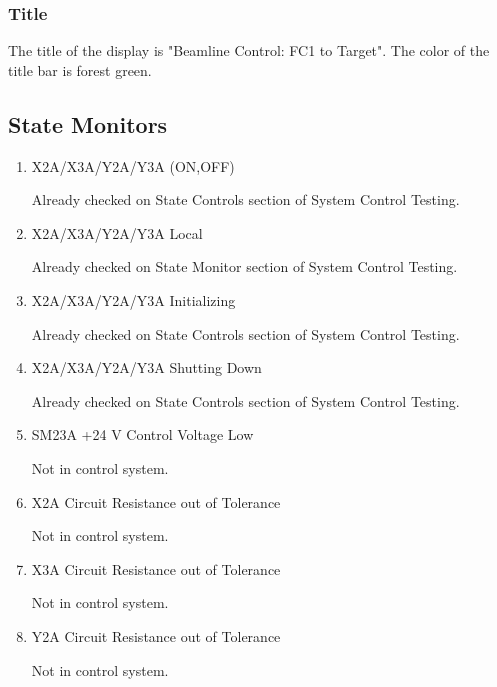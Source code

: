 \documentclass[11pt]{book}		%
\begin{document}
\subsubsection{Title}\label{sect:cyc-op-interface-status-terminal-display-contents-beamline-target-title}

The title of the display is "Beamline Control: FC1 to Target".  The color of the title bar is forest green.

\subsection{State Monitors} \label{sect:cyc-op-interface-status-beamline-fc1totarget-state-monitors}

\begin{enumerate}
 \item X2A/X3A/Y2A/Y3A (ON,OFF)

\color{red}
Already checked on State Controls section of System Control Testing.
\color{black}

 \item X2A/X3A/Y2A/Y3A Local

\color{red}
Already checked on State Monitor section of System Control Testing.
\color{black}

 \item X2A/X3A/Y2A/Y3A Initializing

\color{red}
Already checked on State Controls section of System Control Testing.
\color{black}

 \item X2A/X3A/Y2A/Y3A Shutting Down

\color{red}
Already checked on State Controls section of System Control Testing.
\color{black}

 \item SM23A +24 V Control Voltage Low

\color{red}
Not in control system.
\color{black}

 \item X2A Circuit Resistance out of Tolerance

\color{red}
Not in control system.
\color{black}

 \item X3A Circuit Resistance out of Tolerance

\color{red}
Not in control system.
\color{black}

 \item Y2A Circuit Resistance out of Tolerance

\color{red}
Not in control system.
\color{black}


\end{enumerate}
\end{document}
